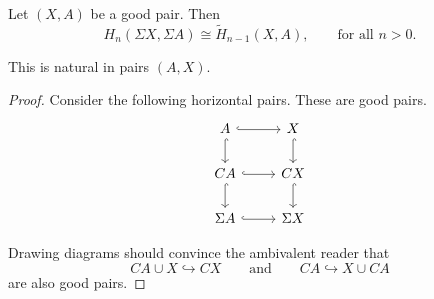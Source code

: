\documentclass[main.tex]{subfiles}
\begin{document}
\begin{theorem}
  \label{thm:suspension_isomorphism}
  Let $(X, A)$ be a good pair. Then
  \begin{equation*}
    H_{n}(\Sigma X, \Sigma A) \cong \tilde{H}_{n-1}(X, A),\qquad \text{for all }n > 0.
  \end{equation*}

  This is natural in pairs \((A, X)\).
\end{theorem}
\begin{proof}
  Consider the following horizontal pairs. These are good pairs.
  \begin{equation*}
    \begin{tikzcd}
      A
      \arrow[r, hook]
      \arrow[d, hook]
      & X
      \arrow[d, hook]
      \\
      CA
      \arrow[r, hook]
      \arrow[d, hook]
      & CX
      \arrow[d, hook]
      \\
      \Sigma A
      \arrow[r, hook]
      & \Sigma X
    \end{tikzcd}
  \end{equation*}

  Drawing diagrams should convince the ambivalent reader that
  \begin{equation*}
    CA \cup X \hookrightarrow CX\qquad\text{and}\qquad CA \hookrightarrow X \cup CA
  \end{equation*}
  are also good pairs.


\end{proof}
\end{document}
